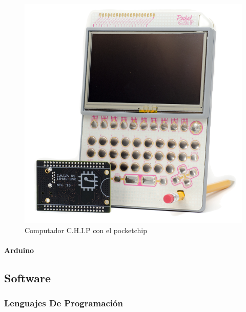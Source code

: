 \documentclass{article}
\begin{document}
\begin{figure}[hptp]
    \centering
    \includegraphics[scale=0.3]{imag/chip.png}
    \caption{Computador C.H.I.P con el pocketchip}
    \label{fig:chip}
\end{figure}
\smallskip

\paragraph{Arduino}



\subsection{Software}

\subsubsection{Lenguajes De Programación}
\end{document}

